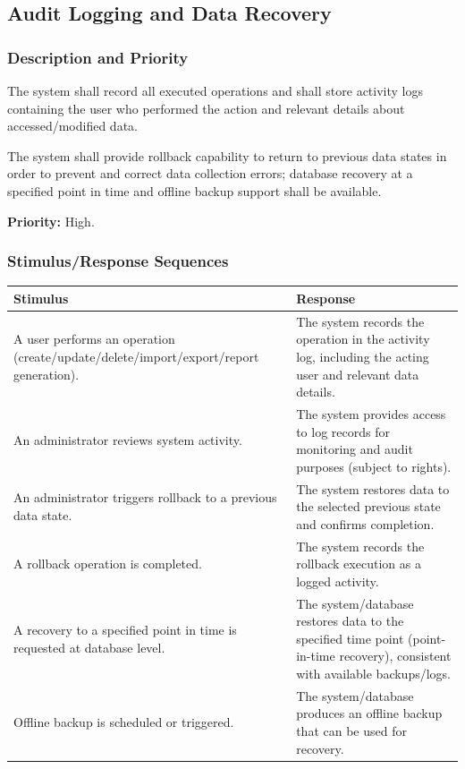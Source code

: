 \documentclass[11pt, a4paper]{article}
\begin{document}
\subsection{Audit Logging and Data Recovery}
\subsubsection{Description and Priority}
The system shall record all executed operations and shall store activity logs containing the user who performed the action and relevant details about accessed/modified data.

The system shall provide rollback capability to return to previous data states in order to prevent and correct data collection errors; database recovery at a specified point in time and offline backup support shall be available.

\textbf{Priority:} High.

\subsubsection{Stimulus/Response Sequences}
\begin{table}[H]
\begin{tabularx}{\textwidth}{>{\raggedright\arraybackslash}p{3.2cm} >{\raggedright\arraybackslash}X}
\toprule
\textbf{Stimulus} & \textbf{Response} \\
\midrule
A user performs an operation (create/update/delete/import/export/report generation). & The system records the operation in the activity log, including the acting user and relevant data details. \\
\midrule
An administrator reviews system activity. & The system provides access to log records for monitoring and audit purposes (subject to rights). \\
\midrule
An administrator triggers rollback to a previous data state. & The system restores data to the selected previous state and confirms completion. \\
\midrule
A rollback operation is completed. & The system records the rollback execution as a logged activity. \\
\midrule
A recovery to a specified point in time is requested at database level. & The system/database restores data to the specified time point (point-in-time recovery), consistent with available backups/logs. \\
\midrule
Offline backup is scheduled or triggered. & The system/database produces an offline backup that can be used for recovery. \\
\bottomrule
\end{tabularx}
\end{table}
\end{document}
